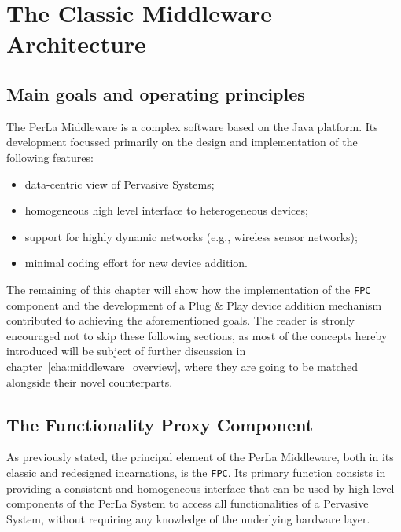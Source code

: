 \section{The Classic Middleware Architecture}

\subsection{Main goals and operating principles}

The PerLa Middleware is a complex software based on the Java platform. Its
development focussed primarily on the design and implementation of the
following features:

\begin{itemize}

    \item data-centric view of Pervasive Systems;

    \item homogeneous high level interface to heterogeneous
        devices;

    \item support for highly dynamic networks (e.g., wireless
        sensor networks);

    \item minimal coding effort for new device addition.

\end{itemize}

The remaining of this chapter will show how the implementation of the
\texttt{FPC} component and the development of a Plug \& Play device addition
mechanism contributed to achieving the aforementioned goals. The reader is
stronly encouraged not to skip these following sections, as most of the
concepts hereby introduced will be subject of further discussion in
chapter~\ref{cha:middleware_overview}, where they are going to be matched
alongside their novel counterparts.

\subsection{The Functionality Proxy Component}

As previously stated, the principal element of the PerLa Middleware, both in
its classic and redesigned incarnations, is the \texttt{FPC}. Its primary
function consists in providing a consistent and homogeneous interface that can
be used by high-level components of the PerLa System to access all
functionalities of a Pervasive System, without requiring any knowledge of the
underlying hardware layer.

